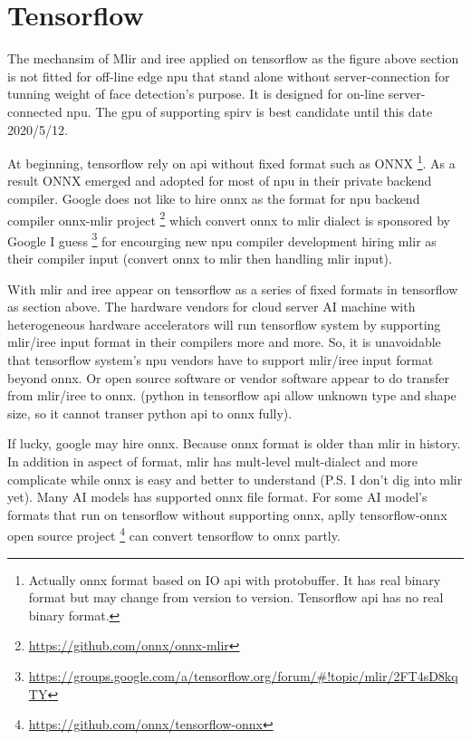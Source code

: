 \documentclass[letterpaper,10pt,english]{sphinxmanual}
\begin{document}
\section{Tensorflow}
\label{npu:tensorflow}
The mechansim of Mlir and iree applied on tensorflow as the figure above section
is not fitted for off-line edge npu that stand alone without server-connection
for tunning weight of face detection's purpose.
It is designed for on-line server-connected npu.
The gpu of supporting spirv is best candidate until this date 2020/5/12.

At beginning, tensorflow rely on api without fixed format such as ONNX \footnote[5]{\sphinxAtStartFootnote%
Actually onnx format based on IO api with protobuffer. It has real binary format but may change from version to version. Tensorflow api has no real binary format.
}.
As a result ONNX emerged and adopted for most of npu in their private backend
compiler. Google does not like to hire onnx as the format for npu backend compiler
onnx-mlir project \footnote[6]{\sphinxAtStartFootnote%
\url{https://github.com/onnx/onnx-mlir}
} which convert onnx to mlir dialect is sponsored
by Google I guess \footnote[7]{\sphinxAtStartFootnote%
\url{https://groups.google.com/a/tensorflow.org/forum/\#!topic/mlir/2FT4sD8kqTY}
} for encourging new npu compiler
development hiring mlir as their compiler input (convert onnx to mlir then
handling mlir input).

With mlir and iree appear on tensorflow as a series of fixed formats in
tensorflow as section above. The hardware vendors for cloud server AI machine
with heterogeneous hardware accelerators will run tensorflow system
by supporting mlir/iree input format in their compilers more and more.
So, it is unavoidable that tensorflow system's npu vendors have to support
mlir/iree input format beyond onnx. Or open source software or vendor software
appear to do transfer from mlir/iree to onnx. (python in tensorflow api allow
unknown type and shape size, so it cannot transer python api to onnx fully).

If lucky, google may hire onnx. Because onnx format is older than mlir
in history. In addition in aspect of format, mlir has mult-level mult-dialect and
more complicate while onnx is easy and better to understand (P.S. I don't dig
into mlir yet).
Many AI models has supported onnx file format. For some AI model's formats that
run on tensorflow without supporting onnx, aplly tensorflow-onnx open
source project \footnote[8]{\sphinxAtStartFootnote%
\url{https://github.com/onnx/tensorflow-onnx}
} can convert tensorflow to onnx partly.
\end{document}

